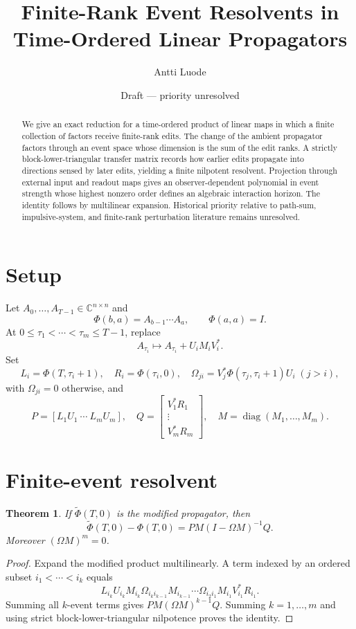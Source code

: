 \documentclass[11pt]{article}
\title{Finite-Rank Event Resolvents in Time-Ordered Linear Propagators}
\author{Antti Luode}
\date{Draft --- priority unresolved}
\newtheorem{theorem}{Theorem}
\begin{document}
\maketitle
\begin{abstract}
We give an exact reduction for a time-ordered product of linear maps in which a finite collection of factors receive finite-rank edits. The change of the ambient propagator factors through an event space whose dimension is the sum of the edit ranks. A strictly block-lower-triangular transfer matrix records how earlier edits propagate into directions sensed by later edits, yielding a finite nilpotent resolvent. Projection through external input and readout maps gives an observer-dependent polynomial in event strength whose highest nonzero order defines an algebraic interaction horizon. The identity follows by multilinear expansion. Historical priority relative to path-sum, impulsive-system, and finite-rank perturbation literature remains unresolved.
\end{abstract}

\section{Setup}
Let $A_0,\ldots,A_{T-1}\in\mathbb C^{n\times n}$ and
\[
\Phi(b,a)=A_{b-1}\cdots A_a,\qquad \Phi(a,a)=I.
\]
At $0\le\tau_1<\cdots<\tau_m\le T-1$, replace
\[
A_{\tau_i}\mapsto A_{\tau_i}+U_iM_iV_i^*.
\]
Set
\[
L_i=\Phi(T,\tau_i+1),\quad R_i=\Phi(\tau_i,0),
\quad \Omega_{ji}=V_j^*\Phi(\tau_j,\tau_i+1)U_i\;(j>i),
\]
with $\Omega_{ji}=0$ otherwise, and
\[
P=[L_1U_1\ \cdots\ L_mU_m],\quad
Q=\begin{bmatrix}V_1^*R_1\\ \vdots\\V_m^*R_m\end{bmatrix},
\quad M=\operatorname{diag}(M_1,\ldots,M_m).
\]

\section{Finite-event resolvent}
\begin{theorem}
If $\widetilde\Phi(T,0)$ is the modified propagator, then
\[
\boxed{\widetilde\Phi(T,0)-\Phi(T,0)=PM(I-\Omega M)^{-1}Q.}
\]
Moreover $(\Omega M)^m=0$.
\end{theorem}
\begin{proof}
Expand the modified product multilinearly. A term indexed by an ordered subset
$i_1<\cdots<i_k$ equals
\[
L_{i_k}U_{i_k}M_{i_k}
\Omega_{i_ki_{k-1}}M_{i_{k-1}}\cdots
\Omega_{i_2i_1}M_{i_1}V_{i_1}^*R_{i_1}.
\]
Summing all $k$-event terms gives $PM(\Omega M)^{k-1}Q$. Summing $k=1,\ldots,m$ and using strict block-lower-triangular nilpotence proves the identity.
\end{proof}
\end{document}

